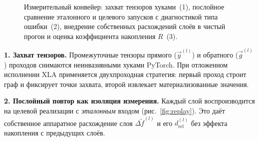 \begin{figure}[htbp]
{}
\caption{Измерительный конвейер: захват тензоров хуками~(1), послойное сравнение
    эталонного и целевого запусков с диагностикой типа ошибки~(2), внедрение
    собственных расхождений слоёв в чистый прогон и оценка коэффициента
    накопления $R$~(3).}
\label{fig:measure}
\end{figure}

\textbf{1. Захват тензоров.} Промежуточные тензоры прямого ($\Vec{y}^{(l)}$) и
обратного ($\Vec{g}^{(l)}$) проходов снимаются неинвазивными хуками PyTorch. При
отложенном исполнении XLA применяется двухпроходная стратегия: первый проход
строит граф и фиксирует точки захвата, второй извлекает материализованные
значения.

\textbf{2. Послойный повтор как изоляция измерения.} Каждый слой воспроизводится
на целевой реализации с \emph{эталонным} входом (рис.~\ref{fig:replay}). Это даёт
собственное аппаратное расхождение слоя $\Delta\tilde f^{(l)}$ и его
$d_{\text{rel}}^{(l)}$ без эффекта накопления с предыдущих слоёв.

